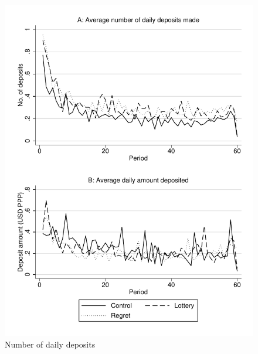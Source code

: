 \documentclass[11pt]{article}
\begin{document}
		\begin{figure}[ht]
		\centering
		\caption{Number of daily deposits}
		\includegraphics[width=\textwidth]{../../figures/line-deposits.pdf}
		\end{figure}
\end{document}
